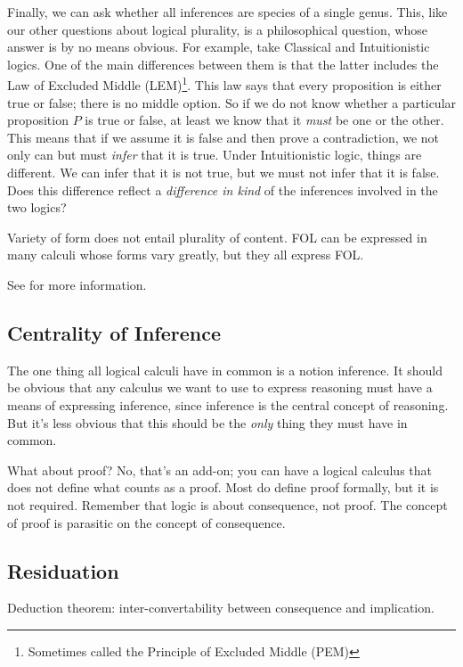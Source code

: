 \documentclass{article}
\begin{document}
Finally, we can ask whether all inferences are species of a single
genus. This, like our other questions about logical plurality, is a
philosophical question, whose answer is by no means obvious. For
example, take Classical and Intuitionistic logics. One of the main
differences between them is that the latter includes the Law of
Excluded Middle (LEM)\footnote{Sometimes called the Principle of
Excluded Middle (PEM)}. This law says that every proposition is either
true or false; there is no middle option. So if we do not know whether
a particular proposition \(P\) is true or false, at least we know that
it \textit{must} be one or the other. This means that if we assume it
is false and then prove a contradiction, we not only can but must
\textit{infer} that it is true. Under Intuitionistic logic, things are
different. We can infer that it is not true, but we must not infer
that it is false. Does this difference reflect a \textit{difference in
  kind} of the inferences involved in the two logics?

Variety of form does not entail plurality of content. FOL can be
expressed in many calculi whose forms vary greatly, but they all
express FOL.

See  \parencite{sep-logical-pluralism}
for more information.


\subsection{Centrality of Inference}

The one thing all logical calculi have in common is a notion
inference. It should be obvious that any calculus we want to use to
express reasoning must have a means of expressing inference, since
inference is the central concept of reasoning. But it's less obvious
that this should be the \textit{only} thing they must have in common.

What about proof? No, that's an add-on; you can have a logical
calculus that does not define what counts as a proof. Most do define
proof formally, but it is not required. Remember that logic is about
consequence, not proof. The concept of proof is parasitic on the
concept of consequence.


\subsection{Residuation}

Deduction theorem: inter-convertability between consequence and
implication.
\end{document}

